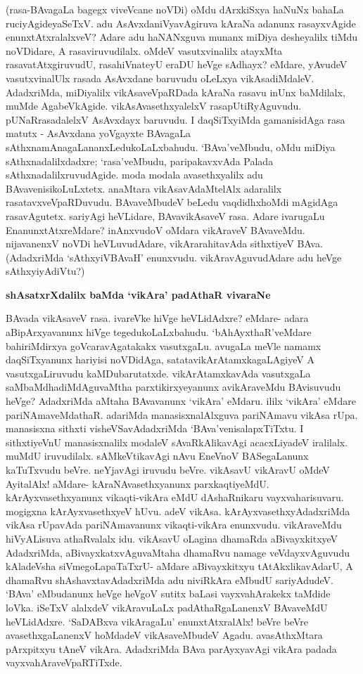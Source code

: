 \noindent
(rasa-BAvagaLa bagegx viveVcane noVDi) oMdu dArxkiSxya haNuNx bahaLa ruciyAgideyaSeTxV. adu AsAvxdaniVyavAgiruva kAraNa adanunx rasayxvAgide enunxtAtxralalxveV? Adare adu haNANxguva munanx miDiya desheyalilx tiMdu noVDidare, A rasaviruvudilalx. oMdeV vasutxvinalilx atayxMta rasavatAtxgiruvudU, rasahiVnateyU eraDU heVge sAdhayx? eMdare, yAvudeV vasutxvinalUlx rasada AsAvxdane baruvudu oLeLxya vikAsadiMdaleV. AdadxriMda, miDiyalilx vikAsaveVpaRDada kAraNa rasavu inUnx baMdilalx, muMde AgabeVkAgide. vikAsAvasethxyalelxV rasapUtiRyAguvudu. pUNaRrasadalelxV AsAvxdayx baruvudu. I daqSiTxyiMda gamanisidAga rasa matutx - AsAvxdana yoVgayxte BAvagaLa sAthxnamAnagaLananxLedukoLaLxbahudu. `BAva'veMbudu, oMdu miDiya sAthxnadalilxdadxre; `rasa'veMbudu, paripakavxvAda Palada sAthxnadalilxruvudAgide. moda modala avasethxyalilx adu BAvavenisikoLuLxtetx. anaMtara vikAsavAdaMtelAlx adaralilx rasatavxveVpaRDuvudu. BAvaveMbudeV beLedu vaqdidhxhoMdi mAgidAga rasavAgutetx. sariyAgi heVLidare, BAvavikAsaveV rasa. Adare ivarugaLu EnanunxtAtxreMdare? inAnxvudoV oMdara vikAraveV BAvaveMdu. nijavanenxV noVDi heVLuvudAdare, vikArarahitavAda sithxtiyeV BAva. (AdadxriMda `sAthxyiVBAvaH' enunxvudu. vikAravAguvudAdare adu heVge sAthxyiyAdiVtu?)

{\bigskip
\noindent
{\large\bf shAsatxrXdalilx baMda `vikAra' padAthaR vivaraNe}}\label{page225}
\medskip

\noindent
BAvada vikAsaveV rasa. ivareVke hiVge heVLidAdxre? eMdare- adara aBipArxyavanunx hiVge tegedukoLaLxbahudu. `bAhAyxthaR'veMdare bahiriMdirxya goVcaravAgatakakx vasutxgaLu. avugaLa meVle namamx daqSiTxyanunx hariyisi noVDidAga, satatavikArAtamxkagaLAgiyeV A vasutxgaLiruvudu kaMDubarutatxde. vikArAtamxkavAda vasutxgaLa saMbaMdhadiMdAguvaMtha parxtikirxyeyanunx avikAraveMdu BAvisuvudu heVge? AdadxriMda aMtaha BAvavanunx `vikAra' eMdaru. ililx `vikAra' eMdare pariNAmaveMdathaR. adariMda manasisxnalAlxguva pariNAmavu vikAsa rUpa. manasisxna sithxti visheVSavAdadxriMda `BAva'venisalapxTiTxtu. I sithxtiyeVnU manasisxnalilx modaleV sAvaRkAlikavAgi acacxLiyadeV iralilalx. muMdU iruvudilalx. sAMkeVtikavAgi nAvu EneVnoV BASegaLanunx kaTuTxvudu beVre. neYjavAgi iruvudu beVre. vikAsavU vikAravU oMdeV AyitalAlx! aMdare- kAraNAvasethxyanunx parxkaqtiyeMdU. kArAyxvasethxyanunx vikaqti-vikAra eMdU dAshaRnikaru vayxvaharisuvaru. mogigxna kArAyxvasethxyeV hUvu. adeV vikAsa. kArAyxvasethxyAdadxriMda vikAsa rUpavAda pariNAmavanunx vikaqti-vikAra enunxvudu. vikAraveMdu hiVyALisuva athaRvalalx idu. vikAsavU oLagina dhamaRda aBivayxkitxyeV AdadxriMda, aBivayxkatxvAguvaMtaha dhamaRvu namage veVdayxvAguvudu kAladeVsha siVmegoLapaTaTxrU- aMdare aBivayxkitxyu tAtAkxlikavAdarU, A dhamaRvu shAshavxtavAdadxriMda adu niviRkAra eMbudU sariyAdudeV. `BAva' eMbudanunx heVge heVgoV sutitx baLasi vayxvahArakekx taMdide loVka. iSeTxV alalxdeV vikAravuLaLx padAthaRgaLanenxV BAvaveMdU heVLidAdxre. `SaDABxva vikAragaLu'\label{226} enunxtAtxralAlx! beVre beVre avasethxgaLanenxV hoMdadeV vikAsaveMbudeV Agadu. avasAthxMtara pArxpitxyu tAneV vikAra. AdadxriMda BAva parAyxyavAgi vikAra padada vayxvahAraveVpaRTiTxde.

